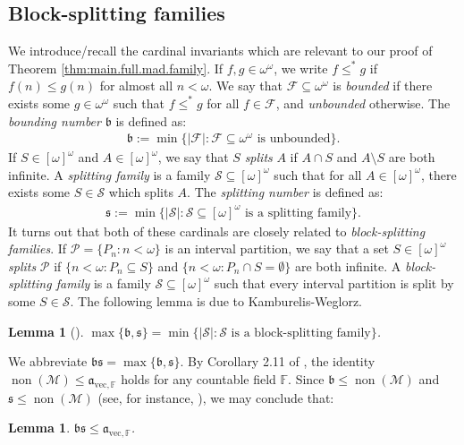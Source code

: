 \documentclass[10pt,a4paper]{amsart}
\theoremstyle{plain}
\numberwithin{equation}{section}
\newtheorem{lemma}[theorem]{Lemma}
\theoremstyle{definition}
\newcommand{\func}{\operatorname}
\newcommand{\Po}{\cal{P}}
\newcommand{\F}{\cal{F}}
\newcommand{\cal}{\mathcal}
\renewcommand{\frak}{\mathfrak}
\newcommand{\non}{\func{non}}
\newcommand{\M}{\mathcal{M}}
\newcommand{\avec}{\frak{a}_{\mathrm{vec},\mathbb{F}}}
\renewcommand{\S}{\mathcal{S}}
\begin{document}
\subsection{Block-splitting families}
We introduce/recall the cardinal invariants which are relevant to our proof of Theorem \ref{thm:main.full.mad.family}. If $f,g \in \omega^\omega$, we write $f \leq^* g$ if $f(n) \leq g(n)$ for almost all $n < \omega$. We say that $\F \subseteq \omega^\omega$ is \emph{bounded} if there exists some $g \in \omega^\omega$ such that $f \leq^* g$ for all $f \in \F$, and \emph{unbounded} otherwise. The \emph{bounding number} $\frak{b}$ is defined as:
\begin{align*}
    \frak{b} := \min\{|\F| : \F \subseteq \omega^\omega \text{ is unbounded}\}.
\end{align*}
If $S \in [\omega]^\omega$ and $A \in [\omega]^\omega$, we say that $S$ \emph{splits} $A$ if $A \cap S$ and $A \setminus S$ are both infinite. A \emph{splitting family} is a family $\S \subseteq [\omega]^\omega$ such that for all $A \in [\omega]^\omega$, there exists some $S \in \S$ which splits $A$. The \emph{splitting number} is defined as:
\begin{align*}
    \frak{s} := \min\{|\S| : \S \subseteq [\omega]^\omega \text{ is a splitting family}\}.
\end{align*}
It turns out that both of these cardinals are closely related to \emph{block-splitting families}. If $\Po = \{P_n : n < \omega\}$ is an interval partition, we say that a set $S \in [\omega]^\omega$ \emph{splits} $\Po$ if $\{n < \omega : P_n \subseteq S\}$ and $\{n < \omega : P_n \cap S = \emptyset\}$ are both infinite. A \emph{block-splitting family} is a family $\S \subseteq [\omega]^\omega$ such that every interval partition is split by some $S \in \S$. The following lemma is due to Kamburelis-Weglorz.

\begin{lemma}[\cite{KW96}]
    $\max\{\frak{b},\frak{s}\} = \min\{|\S| : \S \text{ is a block-splitting family}\}$.
\end{lemma}

We abbreviate $\frak{bs} = \max\{\frak{b},\frak{s}\}$. By Corollary 2.11 of \cite{S19}, the identity $\non(\M) \leq \avec$ holds for any countable field $\mathbb{F}$. Since $\frak{b} \leq \non(\M)$ and $\frak{s} \leq \non(\M)$ (see, for instance, \cite{blasshandbook}), we may conclude that:

\begin{lemma}
\label{lem:bs.leq.avec}
    $\frak{bs} \leq \avec$.
\end{lemma}
\end{document}
